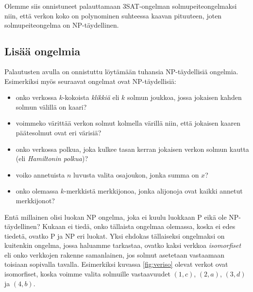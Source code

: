 Olemme siis onnistuneet palauttamaan 3SAT-ongelman solmupeiteongelmaksi
niin, että verkon koko on polynominen suhteessa kaavan pituuteen,
joten solmupeiteongelma on NP-täydellinen.

\subsection{Lisää ongelmia}

Palautusten avulla on onnistuttu löytämään tuhansia NP-täydellisiä ongelmia.
Esimerkiksi myös seuraavat ongelmat ovat NP-täydellisiä:


\begin{itemize}
\item onko verkossa $k$-kokoista \emph{klikkiä} eli $k$ solmun joukkoa,
jossa jokaisen kahden solmun välillä on kaari?
\item voimmeko värittää verkon solmut kolmella värillä niin,
että jokaisen kaaren päätesolmut ovat eri värisiä?
\item onko verkossa polkua, joka kulkee tasan kerran jokaisen
verkon solmun kautta (eli \emph{Hamiltonin polkua})?
\item voiko annetuista $n$ luvusta valita osajoukon, jonka summa on $x$?
\item onko olemassa $k$-merkkistä merkkijonoa,
jonka alijonoja ovat kaikki annetut merkkijonot?
\end{itemize}


Entä millainen olisi luokan NP ongelma, joka ei kuulu luokkaan P
eikä ole NP-täydellinen?
Kukaan ei tiedä, onko tällaista ongelmaa olemassa,
koska ei edes tiedetä, ovatko P ja NP eri luokat.
Yksi ehdokas tällaiseksi ongelmaksi on kuitenkin ongelma,
jossa haluamme tarkastaa,
ovatko kaksi verkkoa \emph{isomorfiset} eli
onko verkkojen rakenne samanlainen,
jos solmut asetetaan vastaamaan toisiaan sopivalla tavalla.
Esimerkiksi kuvassa \ref{fig:veriso} olevat verkot ovat isomorfiset,
koska voimme valita solmuille vastaavuudet $(1,c)$, $(2,a)$, $(3,d)$ ja $(4,b)$.

